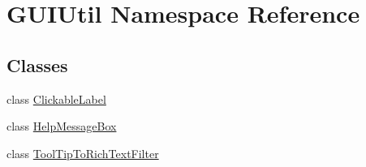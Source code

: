 \hypertarget{namespace_g_u_i_util}{}\section{G\+U\+I\+Util Namespace Reference}
\label{namespace_g_u_i_util}
\subsection*{Classes}
\begin{DoxyCompactItemize}
\item 
class \hyperlink{class_g_u_i_util_1_1_clickable_label}{Clickable\+Label}
\item 
class \hyperlink{class_g_u_i_util_1_1_help_message_box}{Help\+Message\+Box}
\item 
class \hyperlink{class_g_u_i_util_1_1_tool_tip_to_rich_text_filter}{Tool\+Tip\+To\+Rich\+Text\+Filter}
\end{DoxyCompactItemize}
